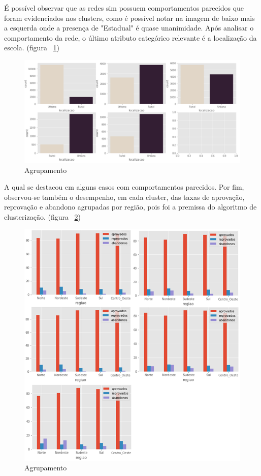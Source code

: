 \documentclass[review]{elsarticle}
\begin{document}
É possível observar que as redes sim possuem comportamentos parecidos que foram evidenciados nos clusters, como é possível notar na imagem de baixo mais a esquerda onde  a presença de "Estadual" é quase unanimidade. Após analisar o comportamento da rede, o último atributo categórico relevante é a localização da escola. (figura ~\ref{fig:c3})\par
\begin{figure}[h!]
\includegraphics[width=345pt]{cluster_3.png}
\caption{Agrupamento}
\label{fig:c3}
\centering
\end{figure}
A qual se destacou em alguns casos com comportamentos parecidos. Por fim, observou-se também o desempenho, em cada cluster, das taxas de aprovação, reprovação e abandono agrupadas por região, pois foi a premissa do algoritmo de clusterização. (figura ~\ref{fig:c4})\par
\begin{figure}[h!]
\includegraphics[width=345pt]{cluster_4.png}
\caption{Agrupamento}
\label{fig:c4}
\centering
\end{figure}
\end{document}
